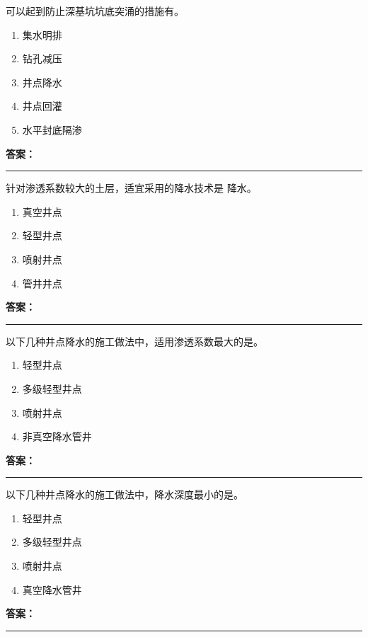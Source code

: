 \documentclass[UTF8,fontset=fandol,11pt]{ctexart}
\newcommand{\answerline}{\textcolor{answerred}{\rule{2.4cm}{0.7pt}}}
\begin{document}
\vspace{0.2em}

\begin{quizbox}[title={第 14 题}]
可以起到防止深基坑坑底突涌的措施有。\\
\begin{enumerate}[label=\Alph*.]
\item 集水明排
\item 钻孔减压
\item 井点降水
\item 井点回灌
\item 水平封底隔渗
\end{enumerate}
\textbf{\textcolor{answerred}{答案：}} \answerline
\end{quizbox}

\vspace{0.2em}

\begin{quizbox}[title={第 15 题}]
针对渗透系数较大的土层，适宜采用的降水技术是 降水。\\
\begin{enumerate}[label=\Alph*.]
\item 真空井点
\item 轻型井点
\item 喷射井点
\item 管井井点
\end{enumerate}
\textbf{\textcolor{answerred}{答案：}} \answerline
\end{quizbox}

\vspace{0.2em}

\begin{quizbox}[title={第 16 题}]
以下几种井点降水的施工做法中，适用渗透系数最大的是。\\
\begin{enumerate}[label=\Alph*.]
\item 轻型井点
\item 多级轻型井点
\item 喷射井点
\item 非真空降水管井
\end{enumerate}
\textbf{\textcolor{answerred}{答案：}} \answerline
\end{quizbox}

\vspace{0.2em}

\begin{quizbox}[title={第 17 题}]
以下几种井点降水的施工做法中，降水深度最小的是。\\
\begin{enumerate}[label=\Alph*.]
\item 轻型井点
\item 多级轻型井点
\item 喷射井点
\item 真空降水管井
\end{enumerate}
\textbf{\textcolor{answerred}{答案：}} \answerline
\end{quizbox}
\end{document}
